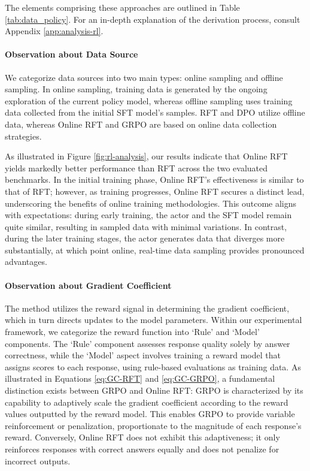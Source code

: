 \begin{itemize}[topsep=0pt]
\begin{itemize}[topsep=0pt]
The elements comprising these approaches are outlined in Table \ref{tab:data_policy}. For an in-depth explanation of the derivation process, consult Appendix \ref{app:analysis-rl}.

\paragraph{Observation about Data Source} We categorize data sources into two main types: online sampling and offline sampling. In online sampling, training data is generated by the ongoing exploration of the current policy model, whereas offline sampling uses training data collected from the initial SFT model’s samples. RFT and DPO utilize offline data, whereas Online RFT and GRPO are based on online data collection strategies.

As illustrated in Figure \ref{fig:rl-analysis}, our results indicate that Online RFT yields markedly better performance than RFT across the two evaluated benchmarks. In the initial training phase, Online RFT’s effectiveness is similar to that of RFT; however, as training progresses, Online RFT secures a distinct lead, underscoring the benefits of online training methodologies. This outcome aligns with expectations: during early training, the actor and the SFT model remain quite similar, resulting in sampled data with minimal variations. In contrast, during the later training stages, the actor generates data that diverges more substantially, at which point online, real-time data sampling provides pronounced advantages.

\paragraph{Observation about Gradient Coefficient} The method utilizes the reward signal in determining the gradient coefficient, which in turn directs updates to the model parameters. Within our experimental framework, we categorize the reward function into `Rule' and `Model' components. The `Rule' component assesses response quality solely by answer correctness, while the `Model' aspect involves training a reward model that assigns scores to each response, using rule-based evaluations as training data. As illustrated in Equations \ref{eq:GC-RFT} and \ref{eq:GC-GRPO}, a fundamental distinction exists between GRPO and Online RFT: GRPO is characterized by its capability to adaptively scale the gradient coefficient according to the reward values outputted by the reward model. This enables GRPO to provide variable reinforcement or penalization, proportionate to the magnitude of each response’s reward. Conversely, Online RFT does not exhibit this adaptiveness; it only reinforces responses with correct answers equally and does not penalize for incorrect outputs.


\end{itemize}
\end{itemize}
